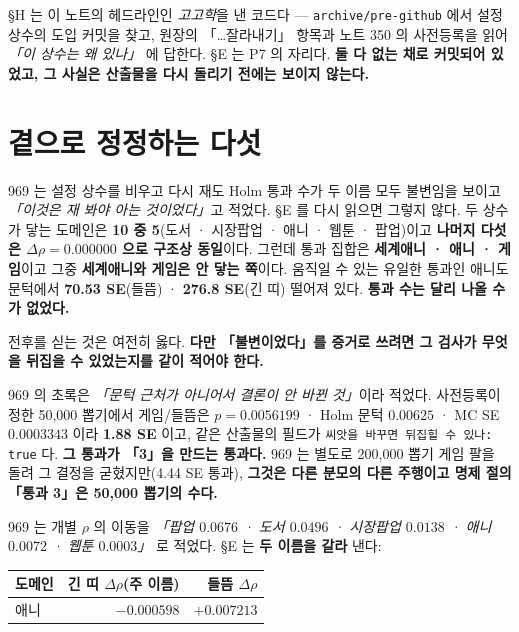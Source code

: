 \documentclass[10pt]{article}
\begin{document}
\medskip
§H 는 이 노트의 헤드라인인 \emph{고고학}을 낸 코드다 --- \texttt{archive/pre-github} 에서
설정 상수의 도입 커밋을 찾고, 원장의 「\ldots 잘라내기」 항목과 노트 350 의 사전등록을 읽어
\emph{「이 상수는 왜 있나」} 에 답한다. §E 는 P7 의 자리다. \textbf{둘 다 없는 채로 커밋되어
있었고, 그 사실은 산출물을 다시 돌리기 전에는 보이지 않는다.}

\section{곁으로 정정하는 다섯}


969 는 설정 상수를 비우고 다시 재도 Holm 통과 수가 두 이름 모두 불변임을 보이고
\emph{「이것은 재 봐야 아는 것이었다」}고 적었다. §E 를 다시 읽으면 그렇지 않다.
두 상수가 닿는 도메인은 \textbf{10 중 5}(도서 · 시장팝업 · 애니 · 웹툰 · 팝업)이고
\textbf{나머지 다섯은 $\Delta\rho = 0.000000$ 으로 구조상 동일}이다. 그런데 통과 집합은
\textbf{세계애니 · 애니 · 게임}이고 그중 \textbf{세계애니와 게임은 안 닿는 쪽}이다.
움직일 수 있는 유일한 통과인 애니도 문턱에서 \textbf{70.53 SE}(들뜸) ·
\textbf{276.8 SE}(긴 띠) 떨어져 있다. \textbf{통과 수는 달리 나올 수가 없었다.}

전후를 싣는 것은 여전히 옳다. \textbf{다만 「불변이었다」를 증거로 쓰려면 그 검사가
무엇을 뒤집을 수 있었는지를 같이 적어야 한다.}


969 의 초록은 \emph{「문턱 근처가 아니어서 결론이 안 바뀐 것」}이라 적었다. 사전등록이 정한
50{,}000 뽑기에서 게임/들뜸은 $p = 0.0056199$ · Holm 문턱 $0.00625$ · MC SE $0.0003343$ 이라
\textbf{1.88 SE} 이고, 같은 산출물의 필드가 \texttt{씨앗을 바꾸면 뒤집힐 수 있나: true} 다.
\textbf{그 통과가 「3」을 만드는 통과다.} 969 는 별도로 200{,}000 뽑기 게임 팔을 돌려 그 결정을
굳혔지만(4.44 SE 통과), \textbf{그것은 다른 분모의 다른 주행이고 명제 절의 「통과 3」은
50{,}000 뽑기의 수다.}


969 는 개별 $\rho$ 의 이동을 \emph{「팝업 $0.0676$ · 도서 $0.0496$ · 시장팝업 $0.0138$ ·
애니 $0.0072$ · 웹툰 $0.0003$」} 로 적었다. §E 는 \textbf{두 이름을 갈라} 낸다:

\begin{center}\small
\begin{tabular}{lrr}
도메인 & \textbf{긴 띠 $\Delta\rho$(주 이름)} & 들뜸 $\Delta\rho$ \\
\hline
애니 & $-0.000598$ & $+0.007213$ \\
\end{tabular}
\end{center}
\end{document}
